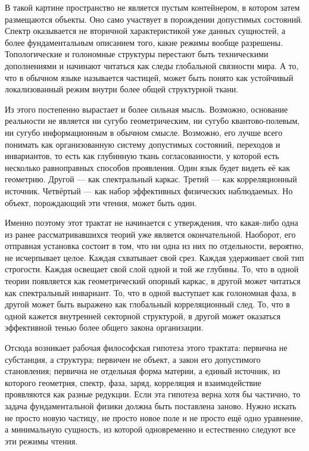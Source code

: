 \documentclass[12pt,a4paper]{article}
\begin{document}
В такой картине пространство не является пустым контейнером, в котором затем размещаются объекты. Оно само участвует в порождении допустимых состояний. Спектр оказывается не вторичной характеристикой уже данных сущностей, а более фундаментальным описанием того, какие режимы вообще разрешены. Топологические и голономные структуры перестают быть техническими дополнениями и начинают читаться как следы глобальной связности мира. А то, что в обычном языке называется частицей, может быть понято как устойчивый локализованный режим внутри более общей структурной ткани.

Из этого постепенно вырастает и более сильная мысль. Возможно, основание реальности не является ни сугубо геометрическим, ни сугубо квантово-полевым, ни сугубо информационным в обычном смысле. Возможно, его лучше всего понимать как организованную систему допустимых состояний, переходов и инвариантов, то есть как глубинную ткань согласованности, у которой есть несколько равноправных способов проявления. Один язык будет видеть её как геометрию. Другой --- как спектральный каркас. Третий --- как корреляционный источник. Четвёртый --- как набор эффективных физических наблюдаемых. Но объект, порождающий эти чтения, может быть один.

Именно поэтому этот трактат не начинается с утверждения, что какая-либо одна из ранее рассматривавшихся теорий уже является окончательной. Наоборот, его отправная установка состоит в том, что ни одна из них по отдельности, вероятно, не исчерпывает целое. Каждая схватывает свой срез. Каждая удерживает свой тип строгости. Каждая освещает свой слой одной и той же глубины. То, что в одной теории появляется как геометрический опорный каркас, в другой может читаться как спектральный инвариант. То, что в одной выступает как голономная фаза, в другой может быть выражено как глобальный корреляционный след. То, что в одной кажется внутренней секторной структурой, в другой может оказаться эффективной тенью более общего закона организации.

Отсюда возникает рабочая философская гипотеза этого трактата: первична не субстанция, а структура; первичен не объект, а закон его допустимого становления; первична не отдельная форма материи, а единый источник, из которого геометрия, спектр, фаза, заряд, корреляция и взаимодействие проявляются как разные редукции. Если эта гипотеза верна хотя бы частично, то задача фундаментальной физики должна быть поставлена заново. Нужно искать не просто новую частицу, не просто новое поле и не просто ещё одно уравнение, а минимальную сущность, из которой одновременно и естественно следуют все эти режимы чтения.
\end{document}
